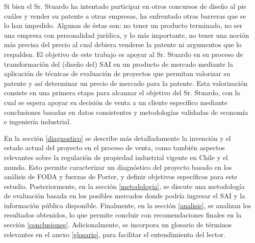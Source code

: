 Si bien el Sr. Stuardo ha intentado participar en otros concursos de diseño al pie cuáles y vender su patente a otras empresas, ha enfrentado otras barreras que se lo han impedido. Algunas de éstas son: no tener un producto terminado, no ser una empresa con personalidad jurídica, y lo más importante, no tener una noción más precisa del precio al cual debiera venderse la patente ni argumentos que lo respalden. El objetivo de este trabajo es apoyar al Sr. Stuardo en su proceso de transformación del (diseño del) SAI en un producto de mercado mediante la aplicación de técnicas de evaluación de proyectos que permitan valorizar su patente y así determinar un precio de mercado para la patente. Esta valorización consiste en una primera etapa para alcanzar el objetivo del Sr. Stuardo, con la cual se espera apoyar su decisión de venta a un cliente específico mediante conclusiones basadas en datos consistentes y metodologías validadas de economía e ingeniería industrial.

En la sección \ref{diagnostico} se describe más detalladamente la invención y el estado actual del proyecto en el proceso de venta, como también aspectos relevantes sobre la regulación de propiedad industrial vigente en Chile y el mundo. Esto permite caracterizar un diagnóstico del proyecto basado en los análisis de FODA y fuerzas de Porter, y definir objetivos específicos para este estudio. Posteriormente, en la sección \ref{metodologia}, se discute una metodología de evaluación basada en los posibles mercados donde podría ingresar el SAI y la información pública disponible. Finalmente, en la sección \ref{analisis}, se analizan los resultados obtenidos, lo que permite concluir con recomendaciones finales en la sección \ref{conclusiones}. Adicionalmente, se incorpora un glosario de términos relevantes en el anexo \ref{glosario}, para facilitar el entendimiento del lector.
